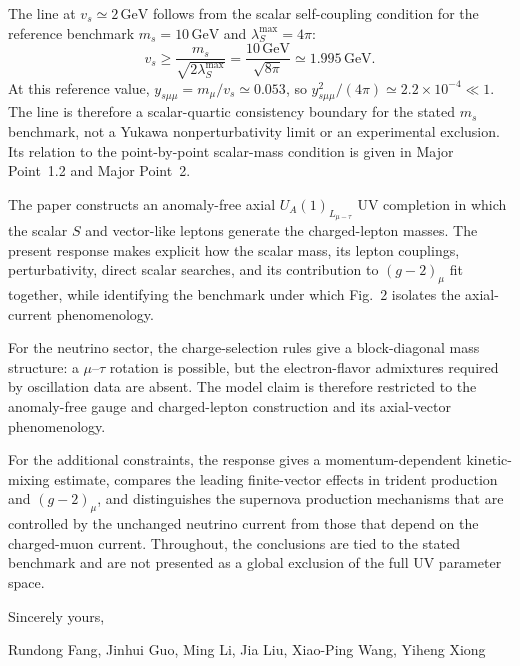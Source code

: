 \documentclass[12pt,a4paper]{article}
\begin{document}
The line at \(v_s\simeq2\,\mathrm{GeV}\) follows from the scalar self-coupling condition for the reference benchmark \(m_s=10\,\mathrm{GeV}\) and \(\lambda_S^{\max}=4\pi\):
\[
v_s\geq\frac{m_s}{\sqrt{2\lambda_S^{\max}}}
=\frac{10\,\mathrm{GeV}}{\sqrt{8\pi}}
\simeq1.995\,\mathrm{GeV}.
\]
At this reference value, \(y_{s\mu\mu}=m_\mu/v_s\simeq0.053\), so \(y_{s\mu\mu}^2/(4\pi)\simeq2.2\times10^{-4}\ll1\). The line is therefore a scalar-quartic consistency boundary for the stated \(m_s\) benchmark, not a Yukawa nonperturbativity limit or an experimental exclusion. Its relation to the point-by-point scalar-mass condition is given in Major Point~1.2 and Major Point~2.

\medskip
{}

The paper constructs an anomaly-free axial \(U_A(1)_{L_{\mu-\tau}}\) UV completion in which the scalar \(S\) and vector-like leptons generate the charged-lepton masses. The present response makes explicit how the scalar mass, its lepton couplings, perturbativity, direct scalar searches, and its contribution to \((g-2)_\mu\) fit together, while identifying the benchmark under which Fig.~2 isolates the axial-current phenomenology.

For the neutrino sector, the charge-selection rules give a block-diagonal mass structure: a \(\mu\)--\(\tau\) rotation is possible, but the electron-flavor admixtures required by oscillation data are absent. The model claim is therefore restricted to the anomaly-free gauge and charged-lepton construction and its axial-vector phenomenology.

For the additional constraints, the response gives a momentum-dependent kinetic-mixing estimate, compares the leading finite-vector effects in trident production and \((g-2)_\mu\), and distinguishes the supernova production mechanisms that are controlled by the unchanged neutrino current from those that depend on the charged-muon current. Throughout, the conclusions are tied to the stated benchmark and are not presented as a global exclusion of the full UV parameter space.

\noindent Sincerely yours,

\noindent Rundong Fang, Jinhui Guo, Ming Li, Jia Liu, Xiao-Ping Wang, Yiheng Xiong



\end{document}
